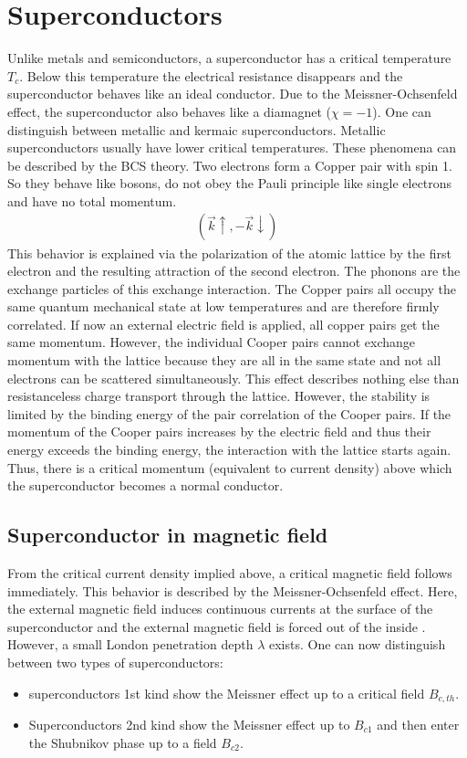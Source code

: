 \section{Superconductors}



Unlike metals and semiconductors, a superconductor has a critical temperature $T_c$. Below this temperature the electrical resistance disappears and the superconductor behaves like an ideal conductor. Due to the Meissner-Ochsenfeld effect, the superconductor also behaves like a diamagnet ($\chi = -1$). One can distinguish between metallic and kermaic superconductors. Metallic superconductors usually have lower critical temperatures. 
These phenomena can be described by the BCS theory. Two electrons form a Copper pair with spin 1. So they behave like bosons, do not obey the Pauli principle like single electrons and have no total momentum.
\begin{align*}
    (\Vec{k} \uparrow , -\Vec{k} \downarrow )
\end{align*}
This behavior is explained via the polarization of the atomic lattice by the first electron and the resulting attraction of the second electron. The phonons are the exchange particles of this exchange interaction. 
The Copper pairs all occupy the same quantum mechanical state at low temperatures and are therefore firmly correlated. If now an external electric field is applied, all copper pairs get the same momentum. However, the individual Cooper pairs cannot exchange momentum with the lattice because they are all in the same state and not all electrons can be scattered simultaneously. This effect describes nothing else than resistanceless charge transport through the lattice. 
However, the stability is limited by the binding energy of the pair correlation of the Cooper pairs. If the momentum of the Cooper pairs increases by the electric field and thus their energy exceeds the binding energy, the interaction with the lattice starts again. Thus, there is a critical momentum (equivalent to current density) above which the superconductor becomes a normal conductor.

\subsection{Superconductor in magnetic field}
From the critical current density implied above, a critical magnetic field follows immediately. This behavior is described by the Meissner-Ochsenfeld effect. Here, the external magnetic field induces continuous currents at the surface of the superconductor and the external magnetic field is forced out of the inside . However, a small London penetration depth $\lambda$ exists. One can now distinguish between two types of superconductors:
\begin{itemize}
    \item superconductors 1st kind show the Meissner effect up to a critical field $B_{c,th}$.
    \item Superconductors 2nd kind show the Meissner effect up to $B_{c1}$ and then enter the Shubnikov phase up to a field $B_{c2}$.
\end{itemize}

